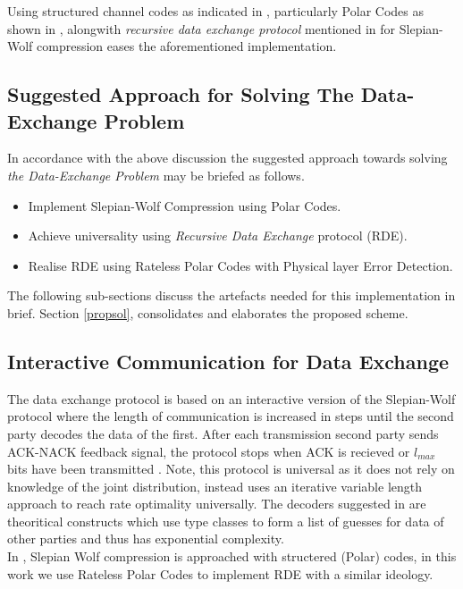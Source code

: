 \documentclass[
11pt, %
a4paper, %
oneside, %
headinclude,footinclude, %
BCOR5mm, %
]{scrartcl}
\begin{document}
Using structured channel codes as indicated in \cite{discus}, particularly Polar Codes as shown in \cite{pslep}, alongwith \emph{recursive data exchange protocol}  mentioned in \cite{htsw} for Slepian-Wolf compression eases the aforementioned implementation. 

\subsection{Suggested Approach for Solving The Data-Exchange Problem}
In accordance with the above discussion the suggested approach towards solving \emph{the Data-Exchange Problem} may be briefed as follows.
\begin{itemize}
\item{Implement Slepian-Wolf Compression using Polar Codes.}
\item{Achieve universality using \emph{Recursive Data Exchange} protocol (RDE).}
\item{Realise RDE using Rateless Polar Codes with Physical layer Error Detection.}
\end{itemize}

The following sub-sections discuss the artefacts needed for this implementation in brief. Section \ref{propsol}, consolidates and elaborates the proposed scheme. 

\subsection{Interactive Communication for Data Exchange}
The data exchange protocol is based on an interactive version of the Slepian-Wolf protocol where the length of communication is increased in steps until the second party decodes the data of the first. After each transmission second party sends ACK-NACK feedback signal, the protocol stops when ACK is recieved or $l_{max}$ bits have been transmitted \cite{htsw}. Note, this protocol is universal as it does not rely on knowledge of the joint distribution, instead uses an iterative variable length approach to reach rate optimality universally. The decoders suggested in \cite{htsw} are theoritical constructs which use type classes to form a list of guesses for data of other parties and thus has exponential complexity.\\ In \cite{pslep}, Slepian Wolf compression is approached with structered (Polar) codes, in this work we use Rateless Polar Codes to implement RDE with a similar ideology.
\end{document}
